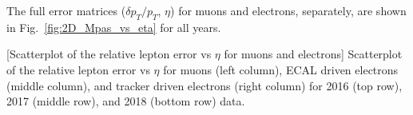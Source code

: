 The full error matrices ($\delta p_{T}/p_{T}$, $\eta$) for muons and electrons, separately, are shown in Fig.~\ref{fig:2D_Mpas_vs_eta} for all years.
\begin{multiFigure}
    \centering



        [Scatterplot of the relative lepton \pt error vs $\eta$ for muons and electrons]
        {Scatterplot of the relative lepton \pt error vs $\eta$ for muons (left column), ECAL driven electrons (middle column), and tracker driven electrons (right column) for 2016 (top row), 2017 (middle row), and 2018 (bottom row) data.}
    \label{fig:2D_Mpas_vs_eta}
\end{multiFigure}
